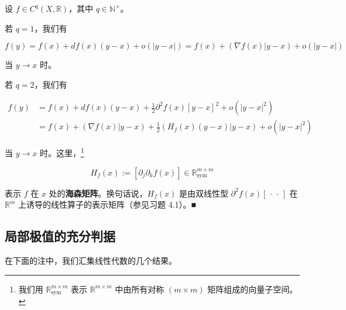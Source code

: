 \begin{remark}

设 $ f \in C^{q}(X, \mathbb{R}) $，其中 $ q \in \mathbb{N}^{\times} $。

\begin{items}
\item

若 $ q = 1 $，我们有

\[
f(y) = f(x) + df(x)(y - x) + o(|y - x|) = f(x) + (\nabla f(x)|y - x) + o(|y - x|)
\]

当 $ y \to x $ 时。

\item

若 $ q = 2 $，我们有

\begin{equation*}
\begin{aligned}
f(y) &= f(x) + df(x)(y - x) + \frac{1}{2}\partial^{2}f(x)[y - x]^{2} + o(|y - x|^{2}) \\ &= f(x) + (\nabla f(x)|y - x) + \frac{1}{2}(H_{f}(x)(y - x)|y - x) + o(|y - x|^{2})
\end{aligned}
\end{equation*}

当 $ y \to x $ 时。这里，\footnote{我们用 $ \mathbb{R}^{m\times m}_{\mathrm{sym}} $ 表示 $ \mathbb{R}^{m\times m} $ 中由所有对称 $ (m \times m) $ 矩阵组成的向量子空间。}

\[
H_{f}(x) := [\partial_{j}\partial_{k}f(x)] \in \mathbb{R}^{m\times m}_{\mathrm{sym}}
\]

表示 $ f $ 在 $ x $ 处的\textbf{海森矩阵}。换句话说，$ H_{f}(x) $ 是由双线性型 $ \partial^{2}f(x)[\,\cdot\,\cdot\,] $ 在 $ \mathbb{R}^{m} $ 上诱导的线性算子的表示矩阵（参见习题 4.1）。\nobreak\hspace{0.35em}■

\end{items}

\end{remark}

\subsection*{局部极值的充分判据}

在下面的注中，我们汇集线性代数的几个结果。

